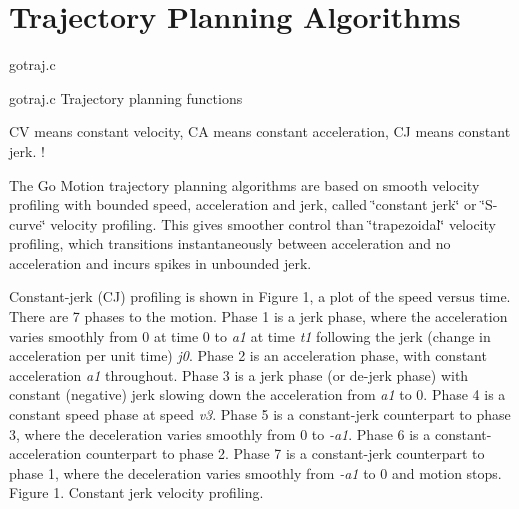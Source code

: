 \hypertarget{group___t_r_a_j}{\section{Trajectory Planning Algorithms}
\label{group___t_r_a_j}
}


gotraj.\-c  


gotraj.\-c Trajectory planning functions

C\-V means constant velocity, C\-A means constant acceleration, C\-J means constant jerk. !

The Go Motion trajectory planning algorithms are based on smooth velocity profiling with bounded speed, acceleration and jerk, called \char`\"{}constant jerk\char`\"{} or \char`\"{}\-S-\/curve\char`\"{} velocity profiling. This gives smoother control than \char`\"{}trapezoidal\char`\"{} velocity profiling, which transitions instantaneously between acceleration and no acceleration and incurs spikes in unbounded jerk.

Constant-\/jerk (C\-J) profiling is shown in Figure 1, a plot of the speed versus time. There are 7 phases to the motion. Phase 1 is a jerk phase, where the acceleration varies smoothly from 0 at time 0 to {\itshape a1} at time {\itshape t1} following the jerk (change in acceleration per unit time) {\itshape j0}. Phase 2 is an acceleration phase, with constant acceleration {\itshape a1} throughout. Phase 3 is a jerk phase (or de-\/jerk phase) with constant (negative) jerk slowing down the acceleration from {\itshape a1} to 0. Phase 4 is a constant speed phase at speed {\itshape v3}. Phase 5 is a constant-\/jerk counterpart to phase 3, where the deceleration varies smoothly from 0 to {\itshape -\/a1}. Phase 6 is a constant-\/acceleration counterpart to phase 2. Phase 7 is a constant-\/jerk counterpart to phase 1, where the deceleration varies smoothly from {\itshape -\/a1} to 0 and motion stops.  Figure 1. Constant jerk velocity profiling. 